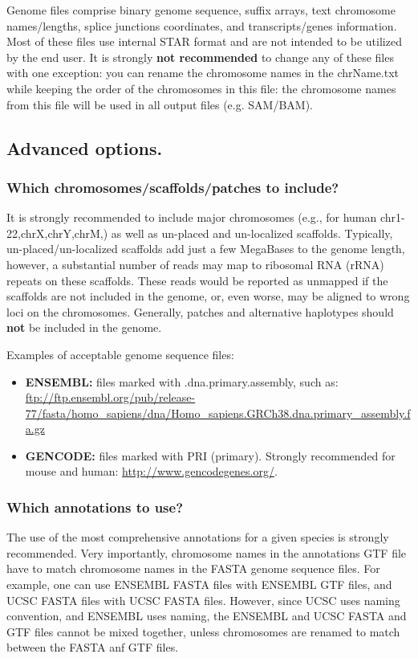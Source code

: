 \documentclass[12pt]{article}
\begin{document}
Genome files comprise binary genome sequence, suffix arrays, text chromosome names/lengths, splice junctions coordinates, and transcripts/genes information. Most of these files use internal STAR format and are not intended to be utilized by the end user. It is strongly \textbf{not recommended} to change any of these files with one exception: you can rename the chromosome names in the chrName.txt while keeping the order of the chromosomes in this file: the chromosome names from this file will be used in all output files (e.g. SAM/BAM).

\subsection{Advanced options.}
\subsubsection{Which chromosomes/scaffolds/patches to include?}
It is strongly recommended to include major chromosomes (e.g., for human chr1-22,chrX,chrY,chrM,) as well as un-placed and un-localized scaffolds. Typically, un-placed/un-localized scaffolds add just a few MegaBases to the genome length, however, a substantial number of reads may map to ribosomal RNA (rRNA) repeats on these scaffolds. These reads would be reported as unmapped if the scaffolds are not included in the genome, or, even worse, may be aligned to wrong loci on the chromosomes. Generally, patches and alternative haplotypes should \textbf{not} be included in the genome.

Examples of acceptable genome sequence files:
\begin{itemize}
\item \textbf{ENSEMBL:} files marked with .dna.primary.assembly, such as:
\url{ftp://ftp.ensembl.org/pub/release-77/fasta/homo_sapiens/dna/Homo_sapiens.GRCh38.dna.primary_assembly.fa.gz}
\item \textbf{GENCODE:} files marked with PRI (primary). Strongly recommended for mouse and human: \url{http://www.gencodegenes.org/}.
\end{itemize}
\subsubsection{Which annotations to use?}
The use of the most comprehensive annotations for a given species is strongly recommended. Very importantly, chromosome names in the annotations GTF file have to match chromosome names in the FASTA genome sequence files. For example, one can use ENSEMBL FASTA files with ENSEMBL GTF files, and UCSC FASTA files with UCSC FASTA files. However, since UCSC uses  naming convention, and ENSEMBL uses  naming, the ENSEMBL and UCSC FASTA and GTF files cannot be mixed together, unless chromosomes are  renamed to match between the FASTA anf GTF files.
\end{document}
